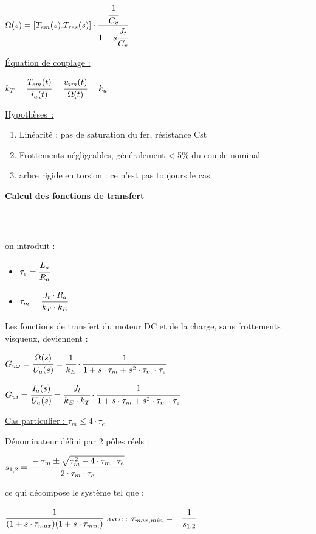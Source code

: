 \documentclass[	DIV=calc,%
							paper=a4,%
							fontsize=10pt,%
							twocolumn]{scrartcl} %
\newcounter{mycounter}
\newcommand{\formdesc}[1]{\large\textbf{#1} \addtocounter{mycounter}{1} \hfill \themycounter \\ \vspace{-3mm} \hrule \vspace{2mm}}
\newcommand{\formtitle}[1]{\large\underline{#1}}
\begin{document}
{\hfill $\Omega(s) = [T_{em}(s).T_{res}(s)] \cdot \cfrac{ \cfrac{1}{C_v}}{1+s\cfrac{J_t}{C_v}}  $\hfill}

\formtitle{Équation de couplage : }

{\hfill $k_T = \cfrac{T_{em}(t)}{i_a(t)} = \cfrac{u_{im}(t)}{\Omega(t) }= k_u$\hfill}

\formtitle{Hypothèses :}
\begin{enumerate}
    \item Linéarité : pas de saturation du fer, résistance Cst
    \item Frottements négligeables, généralement < 5\% du couple nominal
    \item arbre rigide en torsion : ce n’est pas toujours le cas
\end{enumerate}

\formdesc{Calcul des fonctions de transfert}

on introduit :
\begin{itemize}
    \item $\tau_e = \cfrac{L_a}{R_a}$
    \item $\tau_m = \cfrac{J_t\cdot R_a}{k_T\cdot k_E}$
\end{itemize}

Les fonctions de transfert du moteur DC et de la charge, sans frottements visqueux, deviennent :


{\hfill $G_{u\omega} = \cfrac{\Omega(s)}{U_a(s)} = \cfrac{1}{k_E}\cdot\cfrac{1}{1 + s \cdot \tau_m + s^2 \cdot \tau_m \cdot \tau_e} $\hfill}

\vspace{3mm}
{\hfill $G_{ui} = \cfrac{I_a(s)}{U_a(s)} = \cfrac{J_t}{k_E\cdot k_T}\cdot\cfrac{1}{1 + s \cdot \tau_m + s^2 \cdot \tau_m \cdot \tau_e} $\hfill}

\vspace{3mm}

\formtitle{Cas particulier : $\tau_m \leqslant 4 \cdot\tau_e$}

Dénominateur défini par 2 pôles réels :

\vspace{3mm}
{\hfill $s_{1,2} = \cfrac{-\tau_m \pm \sqrt{\tau_m^2 - 4 \cdot \tau_m \cdot \tau_e}}{2 \cdot \tau_m \cdot \tau_e} $\hfill}

\vspace{3mm}
ce qui décompose le système tel que : 

{\hfill $ \cfrac{1}{(1+s\cdot \tau_{max})(1+s\cdot \tau_{min})}$\hfill}
avec : {\hfill $\tau_{max,min} = -\cfrac{1}{s_{1,2}}$\hfill}
\end{document}
